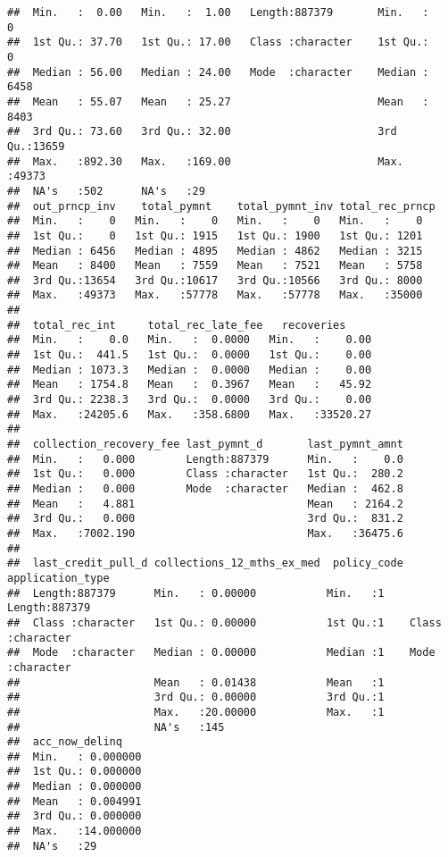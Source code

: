 \documentclass[
]{article}
\begin{document}
\begin{verbatim}
##  Min.   :  0.00   Min.   :  1.00   Length:887379       Min.   :    0  
##  1st Qu.: 37.70   1st Qu.: 17.00   Class :character    1st Qu.:    0  
##  Median : 56.00   Median : 24.00   Mode  :character    Median : 6458  
##  Mean   : 55.07   Mean   : 25.27                       Mean   : 8403  
##  3rd Qu.: 73.60   3rd Qu.: 32.00                       3rd Qu.:13659  
##  Max.   :892.30   Max.   :169.00                       Max.   :49373  
##  NA's   :502      NA's   :29                                          
##  out_prncp_inv    total_pymnt    total_pymnt_inv total_rec_prncp
##  Min.   :    0   Min.   :    0   Min.   :    0   Min.   :    0  
##  1st Qu.:    0   1st Qu.: 1915   1st Qu.: 1900   1st Qu.: 1201  
##  Median : 6456   Median : 4895   Median : 4862   Median : 3215  
##  Mean   : 8400   Mean   : 7559   Mean   : 7521   Mean   : 5758  
##  3rd Qu.:13654   3rd Qu.:10617   3rd Qu.:10566   3rd Qu.: 8000  
##  Max.   :49373   Max.   :57778   Max.   :57778   Max.   :35000  
##                                                                 
##  total_rec_int     total_rec_late_fee   recoveries      
##  Min.   :    0.0   Min.   :  0.0000   Min.   :    0.00  
##  1st Qu.:  441.5   1st Qu.:  0.0000   1st Qu.:    0.00  
##  Median : 1073.3   Median :  0.0000   Median :    0.00  
##  Mean   : 1754.8   Mean   :  0.3967   Mean   :   45.92  
##  3rd Qu.: 2238.3   3rd Qu.:  0.0000   3rd Qu.:    0.00  
##  Max.   :24205.6   Max.   :358.6800   Max.   :33520.27  
##                                                         
##  collection_recovery_fee last_pymnt_d       last_pymnt_amnt  
##  Min.   :   0.000        Length:887379      Min.   :    0.0  
##  1st Qu.:   0.000        Class :character   1st Qu.:  280.2  
##  Median :   0.000        Mode  :character   Median :  462.8  
##  Mean   :   4.881                           Mean   : 2164.2  
##  3rd Qu.:   0.000                           3rd Qu.:  831.2  
##  Max.   :7002.190                           Max.   :36475.6  
##                                                              
##  last_credit_pull_d collections_12_mths_ex_med  policy_code application_type  
##  Length:887379      Min.   : 0.00000           Min.   :1    Length:887379     
##  Class :character   1st Qu.: 0.00000           1st Qu.:1    Class :character  
##  Mode  :character   Median : 0.00000           Median :1    Mode  :character  
##                     Mean   : 0.01438           Mean   :1                      
##                     3rd Qu.: 0.00000           3rd Qu.:1                      
##                     Max.   :20.00000           Max.   :1                      
##                     NA's   :145                                               
##  acc_now_delinq     
##  Min.   : 0.000000  
##  1st Qu.: 0.000000  
##  Median : 0.000000  
##  Mean   : 0.004991  
##  3rd Qu.: 0.000000  
##  Max.   :14.000000  
##  NA's   :29
\end{verbatim}
\end{document}

